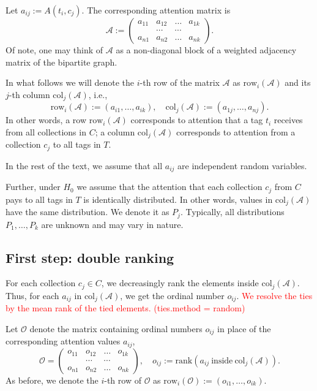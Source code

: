 \documentclass{llncs}
\begin{document}
Let $a_{ij} := A(t_i, c_j)$. The corresponding attention matrix is 
\[
\mathcal{A} := \begin{pmatrix}
a_{11} & a_{12} & \dots & a_{1k} \\
 &\cdots & \cdots & \\
a_{n1} & a_{n2} & \dots & a_{nk}
\end{pmatrix}.
\]
Of note, one may think of $\mathcal{A}$ as a non-diagonal block of a weighted adjacency matrix of the bipartite graph.

In what follows we will denote the $i$-th row of the matrix $\mathcal{A}$ as $\text{row}_i(\mathcal{A})$ and its $j$-th column $\text{col}_j(\mathcal{A})$, i.e.,
\[
\text{row}_i(\mathcal{A}) := (a_{i1}, \dots, a_{ik}),
\quad
\text{col}_j(\mathcal{A}) := (a_{1j}, \dots, a_{nj}).
\]
In other words, a row $\text{row}_i(\mathcal{A})$ corresponds to attention that a tag $t_i$ receives from all collections in $C$; a column $\text{col}_j(\mathcal{A})$ corresponds to attention from a collection $c_j$ to all tags in $T$.

In the rest of the text, we assume that all $a_{ij}$ are independent random variables.

Further, under $H_0$ we assume that the attention that each collection $c_j$ from $C$ pays to all tags in $T$ is identically distributed. In other words, values in $\text{col}_j(\mathcal{A})$have the same distribution. We denote it as $P_j$. Typically, all distributions $P_1, \dots, P_k$ are unknown and may vary in nature. 

\subsection*{First step: double ranking}


For each collection $c_j \in C$, we decreasingly rank the elements inside $\text{col}_j(\mathcal{A})$. Thus, for each $a_{ij} $ in $\text{col}_j(\mathcal{A})$, we get the ordinal number $o_{ij}$. \textcolor{red}{We resolve the ties by the mean rank of the tied elements. (ties.method = random)} 

Let $\mathcal{O}$ denote the matrix containing ordinal numbers $o_{ij}$ in place of the corresponding attention values $a_{ij}$, 
\begin{equation*}
\mathcal{O} = \begin{pmatrix}
o_{11} & o_{12} & \dots & o_{1k} \\
 &\cdots & \cdots & \\
o_{n1} & o_{n2} & \dots & o_{nk}
\end{pmatrix}, 
\quad
o_{ij} :=\text{rank}\left(a_{ij}~ \text{inside}~\text{col}_j(\mathcal{A})\right).
\end{equation*}
As before, we denote the $i$-th row of $\mathcal{O}$ as $\text{row}_i(\mathcal{O}) := (o_{i1}, \dots, o_{ik})$.
\end{document}
